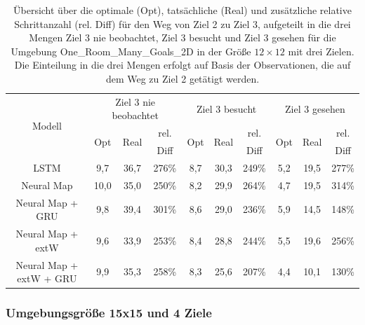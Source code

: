 \begin{table}
  \begin{tabular}{|c|c|c|c|c|c|c|c|c|c|}
    \hline
    \multirow{3}{*}{Modell} & \multicolumn{3}{|c|}{Ziel 3 nie beobachtet} & \multicolumn{3}{|c|}{Ziel 3 besucht} & \multicolumn{3}{|c|}{Ziel 3 gesehen} \\ \cline{2-10}
    & \multirow{2}{*}{Opt} & \multirow{2}{*}{Real} & rel. & \multirow{2}{*}{Opt} & \multirow{2}{*}{Real} & rel. & \multirow{2}{*}{Opt} & \multirow{2}{*}{Real} & rel. \\
    & & & Diff & & & Diff & & & Diff \\ \hline
    LSTM & 9,7 & 36,7 & 276\% & 8,7 & 30,3 & 249\% & 5,2 & 19,5 & 277\% \\ \hline
    Neural Map & 10,0 & 35,0 & 250\% & 8,2 & 29,9 & 264\% & 4,7 & 19,5 & 314\% \\ \hline
    Neural Map + GRU & 9,8 & 39,4 & 301\% & 8,6 & 29,0 & 236\% & 5,9 & 14,5 & 148\% \\ \hline
    Neural Map + extW & 9,6 & 33,9 & 253\% & 8,4 & 28,8 & 244\% & 5,5 & 19,6 & 256\% \\ \hline
    Neural Map + extW + GRU & 9,9 & 35,3 & 258\% & 8,3 & 25,6 & 207\% & 4,4 & 10,1 & 130\% \\ \hline
  \end{tabular}
  \caption{Übersicht über die optimale (Opt), tatsächliche (Real) und zusätzliche relative Schrittanzahl (rel. Diff) für den Weg von Ziel 2 zu Ziel 3, aufgeteilt in die drei Mengen \glqq Ziel 3 nie beobachtet\grqq{}, \glqq Ziel 3 besucht\grqq{} und \glqq Ziel 3 gesehen\grqq{} für die Umgebung \glqq One\_Room\_Many\_Goals\_2D\grqq{} in der Größe $12 \times 12$ mit drei Zielen. Die Einteilung in die drei Mengen erfolgt auf Basis der Observationen, die auf dem Weg zu Ziel 2 getätigt werden.}
  \label{results12x12_2_to_3_per_M}
\end{table}



\subsubsection{Umgebungsgröße 15x15 und 4 Ziele}

